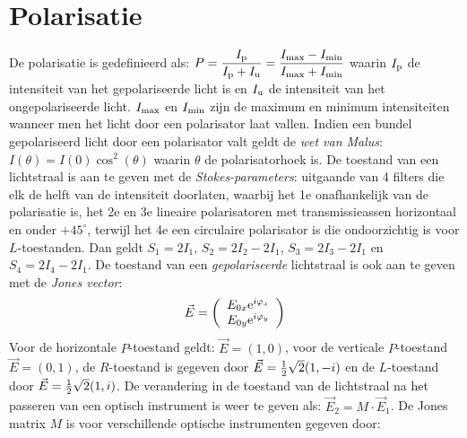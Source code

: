 \section{Polarisatie}
De polarisatie is gedefinieerd als:
$\displaystyle
P=\frac{I_{\rm p}}{I_{\rm p}+I_{\rm u}}=\frac{I_{\rm max}-I_{\rm min}}{I_{\rm max}+I_{\rm min}}
$
\npar
waarin $I_{\rm p}$ de intensiteit van het gepolariseerde licht is en $I_{\rm u}$
de intensiteit van het ongepolariseerde licht. $I_{\rm max}$ en $I_{\rm min}$
zijn de maximum en minimum intensiteiten wanneer men het licht door een
polarisator laat vallen. Indien een bundel gepolariseerd licht door een
polarisator valt geldt de {\it wet van Malus}: $I(\theta)=I(0)\cos^2(\theta)$
waarin $\theta$ de polarisatorhoek is.
\npar
De toestand van een lichtstraal is aan te geven met de {\it Stokes-parameters}:
uitgaande van 4 filters die elk de helft van de intensiteit doorlaten,
waarbij het 1e onafhankelijk van de polarisatie is, het 2e en 3e lineaire
polarisatoren met transmissieassen horizontaal en onder $+45^\circ$, terwijl
het 4e een circulaire polarisator is die ondoorzichtig is voor $L$-toestanden.
Dan geldt $S_1=2I_1$, $S_2=2I_2-2I_1$, $S_3=2I_3-2I_1$ en $S_4=2I_4-2I_1$.
\npar
De toestand van een {\it gepolariseerde} lichtstraal is ook aan te geven met
de {\it Jones vector}:
\[
\vec{E}=\left(\begin{array}{c}
E_{0x}{\rm e}^{i\varphi_x}\\
E_{0y}{\rm e}^{i\varphi_y}
\end{array}\right)
\]
Voor de horizontale $P$-toestand geldt: $\vec{E}=(1,0)$, voor de verticale
$P$-toestand $\vec{E}=(0,1)$, de $R$-toestand is gegeven door
$\vec{E}=\mbox{$\frac{1}{2}$}\sqrt{2}(1,-i)$ en de $L$-toestand door
$\vec{E}=\mbox{$\frac{1}{2}$}\sqrt{2}(1,i)$. De verandering in de toestand van de
lichtstraal na het passeren van een optisch instrument is weer te geven als:
$\vec{E}_2=M\cdot\vec{E}_1$. De Jones matrix $M$ is voor verschillende
optische instrumenten gegeven door:
\npar
